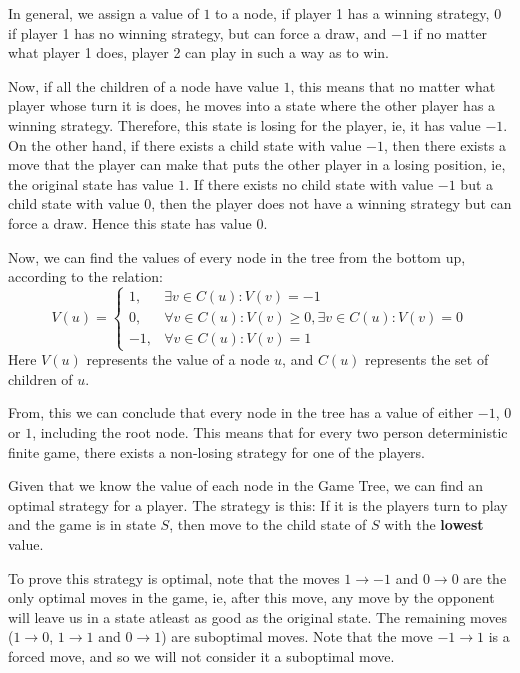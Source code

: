 \documentclass[12pt]{report}
\begin{document}
In general, we assign a value of $1$ to a node, if player 1 has a winning strategy, $0$ if player 1 has no winning strategy, but can force a draw, and $-1$ if no matter what player 1 does, player 2 can play in such a way as to win.

Now, if all the children of a node have value $1$, this means that no matter what player whose turn it is does, he moves into a state where the other player has a winning strategy.
Therefore, this state is losing for the player, ie, it has value $-1$. On the other hand, if there exists a child state with value $-1$, then there exists a move that the player can make
that puts the other player in a losing position, ie, the original state has value $1$. If there exists no child state with value $-1$ but a child state with value $0$, then the player does not have 
a winning strategy but can force a draw. Hence this state has value $0$.

Now, we can find the values of every node in the tree from the bottom up, according to the relation:
\begin{equation}
    V(u) = \begin{cases}
        1, & \exists v \in C(u): V(v) = -1\\
        0, & \forall v \in C(u): V(v) \geq 0, \exists v \in C(u): V(v) = 0 \\
        -1, & \forall v \in C(u): V(v) = 1
    \end{cases}
\end{equation}
Here $V(u)$ represents the value of a node $u$, and $C(u)$ represents the set of children of $u$.

From, this we can conclude that every node in the tree has a value of either $-1$, $0$ or $1$, including the root node. This means that for 
every two person deterministic finite game, there exists a non-losing strategy for one of the players. 

Given that we know the value of each node in the Game Tree, we can find an optimal strategy for a player.
The strategy is this: If it is the players turn to play and the game is in state $S$, then move to the child state of $S$ with the \textbf{lowest} value.

To prove this strategy is optimal, note that the moves $1 \rightarrow -1$ and $0 \rightarrow 0$ are the only optimal moves in the game, ie, after this
move, any move by the opponent will leave us in a state atleast as good as the original state. The remaining moves ($1 \rightarrow 0$, $1 \rightarrow 1$ and $0 \rightarrow 1$) are
suboptimal moves. Note that the move $-1 \rightarrow 1$ is a forced move, and so we will not consider it a suboptimal move.
\end{document}

